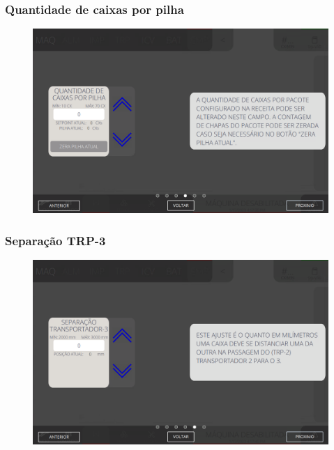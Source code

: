 \newpage
\thispagestyle{fancy}
\vspace*{40 pt}
\subsubsection{\small{Quantidade de caixas por pilha}} \label{sec:telaAjustesEmpilhadorQuantidadeCaixasPilha}
\vspace*{\fill}
\begin{figure}[h]
    \centering
    \includegraphics[width=576 px,height=360 px]{src/imagesICV/08-stacker/settings/4.png}
\end{figure}
\vspace*{\fill}

\newpage
\thispagestyle{fancy}
\vspace*{40 pt}
\subsubsection{\small{Separação TRP-3}} \label{sec:telaAjustesEmpilhadorSeparacaoTRP3}
\vspace*{\fill}
\begin{figure}[h]
    \centering
    \includegraphics[width=576 px,height=360 px]{src/imagesICV/08-stacker/settings/5.png}
\end{figure}
\vspace*{\fill}

